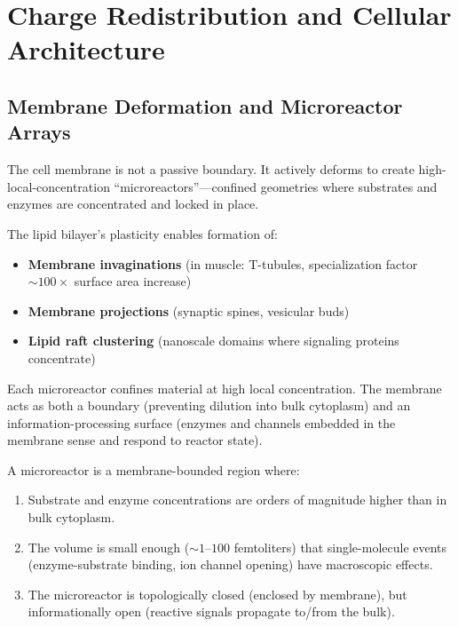 \section{Charge Redistribution and Cellular Architecture}
\label{sec:cellular-architecture}

\subsection{Membrane Deformation and Microreactor Arrays}
\label{subsec:membrane-reactors}

The cell membrane is not a passive boundary. It actively deforms to create high-local-concentration ``microreactors''—confined geometries where substrates and enzymes are concentrated and locked in place.

\begin{principle}
\label{prin:membrane-reactors}
The lipid bilayer's plasticity enables formation of:
\begin{itemize}[noitemsep]
\item \textbf{Membrane invaginations} (in muscle: T-tubules, specialization factor $\sim 100\times$ surface area increase)
\item \textbf{Membrane projections} (synaptic spines, vesicular buds)
\item \textbf{Lipid raft clustering} (nanoscale domains where signaling proteins concentrate)
\end{itemize}

Each microreactor confines material at high local concentration. The membrane acts as both a boundary (preventing dilution into bulk cytoplasm) and an information-processing surface (enzymes and channels embedded in the membrane sense and respond to reactor state).
\end{principle}

\begin{definition}[Microreactor]
\label{def:microreactor}
A microreactor is a membrane-bounded region where:
\begin{enumerate}[label=(\roman*), noitemsep]
\item Substrate and enzyme concentrations are orders of magnitude higher than in bulk cytoplasm.
\item The volume is small enough ($\sim 1$--$100$ femtoliters) that single-molecule events (enzyme-substrate binding, ion channel opening) have macroscopic effects.
\item The microreactor is topologically closed (enclosed by membrane), but informationally open (reactive signals propagate to/from the bulk).
\end{enumerate}
\end{definition}

